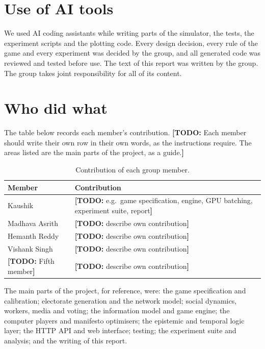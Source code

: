 \documentclass[11pt,a4paper,oneside]{report}
\newcommand{\todo}[1]{\textcolor{todo}{\textbf{[TODO:} #1\textbf{]}}}
\begin{document}
\section{Use of AI tools}

We used AI coding assistants while writing parts of the simulator, the tests, the experiment scripts and
the plotting code. Every design decision, every rule of the game and every experiment was decided by the
group, and all generated code was reviewed and tested before use. The text of this report was written by
the group. The group takes joint responsibility for all of its content.

\section{Who did what}\label{sec:contrib}

The table below records each member's contribution. \todo{Each member should write their own row in their
own words, as the instructions require. The areas listed are the main parts of the project, as a guide.}

\begin{table}[h]
\centering
\caption{Contribution of each group member.}
\label{tab:contrib}
\small
\begin{tabularx}{\linewidth}{@{}p{3.2cm}X@{}}
\toprule
\textbf{Member} & \textbf{Contribution} \\
\midrule
Kaushik            & \todo{e.g.\ game specification, engine, GPU batching, experiment suite, report} \\
Madhava Asrith     & \todo{describe own contribution} \\
Hemanth Reddy      & \todo{describe own contribution} \\
Vishank Singh      & \todo{describe own contribution} \\
\todo{Fifth member}& \todo{describe own contribution} \\
\bottomrule
\end{tabularx}
\end{table}

\noindent
The main parts of the project, for reference, were: the game specification and calibration; electorate
generation and the network model; social dynamics, workers, media and voting; the information model and
game engine; the computer players and manifesto optimisers; the epistemic and temporal logic layer; the
HTTP API and web interface; testing; the experiment suite and analysis; and the writing of this report.
\end{document}
